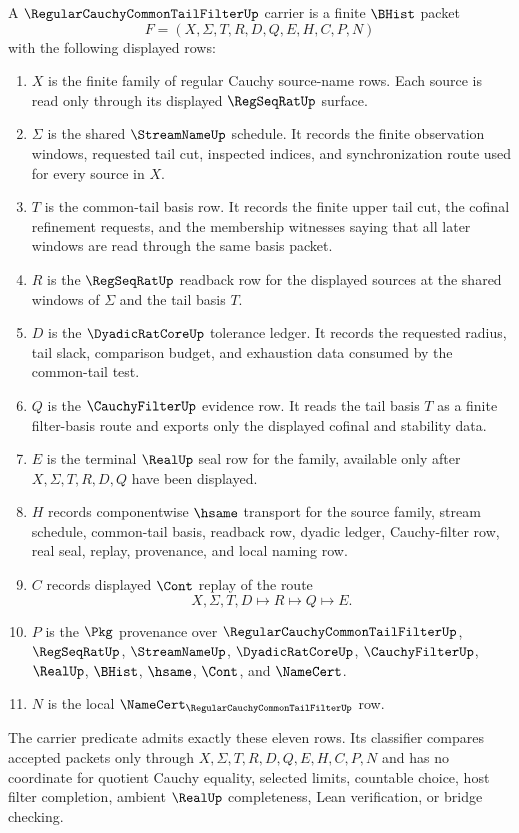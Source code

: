 \begin{definition}
\label{def:regular-cauchy-common-tail-filter-carrier}
A $\RegularCauchyCommonTailFilterUp$ carrier is a finite $\BHist$ packet
$$
F=(X,\Sigma,T,R,D,Q,E,H,C,P,N)
$$
with the following displayed rows:
\begin{enumerate}
\item $X$ is the finite family of regular Cauchy source-name rows. Each source is read only through its displayed $\RegSeqRatUp$ surface.
\item $\Sigma$ is the shared $\StreamNameUp$ schedule. It records the finite observation windows, requested tail cut, inspected indices, and synchronization route used for every source in $X$.
\item $T$ is the common-tail basis row. It records the finite upper tail cut, the cofinal refinement requests, and the membership witnesses saying that all later windows are read through the same basis packet.
\item $R$ is the $\RegSeqRatUp$ readback row for the displayed sources at the shared windows of $\Sigma$ and the tail basis $T$.
\item $D$ is the $\DyadicRatCoreUp$ tolerance ledger. It records the requested radius, tail slack, comparison budget, and exhaustion data consumed by the common-tail test.
\item $Q$ is the $\CauchyFilterUp$ evidence row. It reads the tail basis $T$ as a finite filter-basis route and exports only the displayed cofinal and stability data.
\item $E$ is the terminal $\RealUp$ seal row for the family, available only after $X,\Sigma,T,R,D,Q$ have been displayed.
\item $H$ records componentwise $\hsame$ transport for the source family, stream schedule, common-tail basis, readback row, dyadic ledger, Cauchy-filter row, real seal, replay, provenance, and local naming row.
\item $C$ records displayed $\Cont$ replay of the route
$$
X,\Sigma,T,D \longmapsto R \longmapsto Q \longmapsto E .
$$
\item $P$ is the $\Pkg$ provenance over $\RegularCauchyCommonTailFilterUp$, $\RegSeqRatUp$, $\StreamNameUp$, $\DyadicRatCoreUp$, $\CauchyFilterUp$, $\RealUp$, $\BHist$, $\hsame$, $\Cont$, and $\NameCert$.
\item $N$ is the local $\NameCert_{\RegularCauchyCommonTailFilterUp}$ row.
\end{enumerate}
The carrier predicate admits exactly these eleven rows. Its classifier compares accepted packets only through $X,\Sigma,T,R,D,Q,E,H,C,P,N$ and has no coordinate for quotient Cauchy equality, selected limits, countable choice, host filter completion, ambient $\RealUp$ completeness, Lean verification, or bridge checking.
\end{definition}

